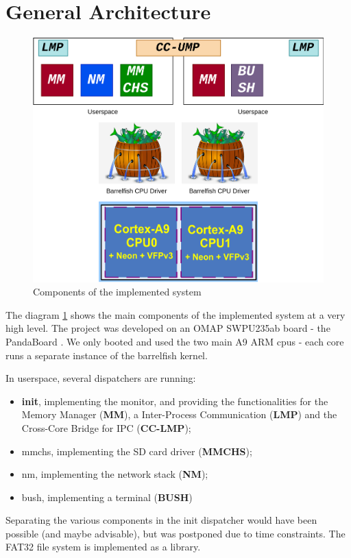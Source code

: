 \documentclass[a4paper,twoside,openright]{report}
\begin{document}
\newpage
\section{General Architecture}
\begin{figure}
	\centering
	\includegraphics[width=0.8\linewidth]{assets/barrelfish}
	\caption{Components of the implemented system}
	\label{fig:barrelfish}
\end{figure}

The diagram \ref{fig:barrelfish} shows the main components of the implemented system at a very high level.
The project was developed on an OMAP SWPU235ab board - the PandaBoard \cite{panda}. We only booted and used the two main A9 ARM cpus - each core runs a separate instance of the barrelfish kernel.

In userspace, several dispatchers are running:
\begin{itemize}
	\item \textbf{init}, implementing the monitor, and providing the functionalities for the Memory Manager (\textbf{MM}), a Inter-Process Communication (\textbf{LMP}) and the Cross-Core Bridge for IPC (\textbf{CC-LMP});
	\item {mmchs}, implementing the SD card driver (\textbf{MMCHS});
	\item {nm}, implementing the network stack (\textbf{NM});
	\item {bush}, implementing a terminal (\textbf{BUSH})
\end{itemize}

Separating the various components in the init dispatcher would have been possible (and maybe advisable), but was postponed due to time constraints.
The FAT32 file system is implemented as a library.
\end{document}
